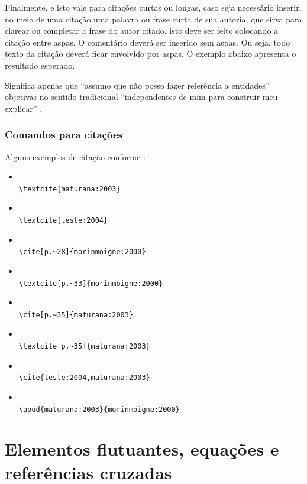 Finalmente, e isto vale para citações curtas ou longas, caso seja necessário inserir, no meio de uma citação uma palavra ou frase curta de sua autoria, que sirva para clarear ou completar a frase do autor citado, isto deve ser feito colocando a citação entre aspas.
O comentário deverá ser inserido sem aspas.
Ou seja, todo texto da citação deverá ficar envolvido por aspas.
O exemplo abaixo apresenta o resultado esperado.

Significa apenas que ``assumo que não posso fazer referência a entidades'' objetivas no sentido tradicional ``independentes de mim para construir meu explicar'' {\textcite[p.~35]{maturana:2003}}.

\subsection{Comandos para citações}\label{referenciasUtilizadas}

Alguns exemplos de citação conforme \textcite{marquesbiblatex}:

\begin{itemize}
    \item \textcite{maturana:2003}\\ \verb|\textcite{maturana:2003}|
    \item \textcite{teste:2004}\\ \verb|\textcite{teste:2004}|
    \item \cite[p.~28]{morinmoigne:2000}\\ \verb|\cite[p.~28]{morinmoigne:2000}|
    \item \textcite[p.~33]{morinmoigne:2000}\\ \verb|\textcite[p.~33]{morinmoigne:2000}|
    \item \cite[p.~35]{maturana:2003}\\ \verb|\cite[p.~35]{maturana:2003}|
    \item \textcite[p.~35]{maturana:2003}\\ \verb|\textcite[p.~35]{maturana:2003}|
    \item \cite{teste:2004,maturana:2003}\\ \verb|\cite{teste:2004,maturana:2003}|
    \item {}\\
    \verb|\apud{maturana:2003}{morinmoigne:2000}|
\end{itemize}


%
%

\chapter{Elementos flutuantes, equações e referências cruzadas}
\label{chap:ef}

